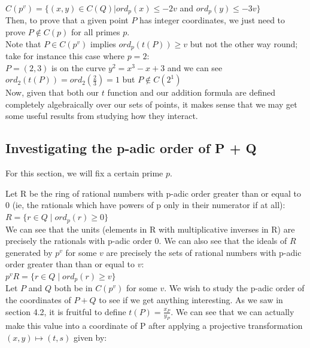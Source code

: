 \documentclass{article}
\begin{document}
$C(p^v) = \{(x, y) \in C(Q) | ord_p(x) \leq -2v$ and $ord_p(y) \leq -3v\}$\\

Then, to prove that a given point $P$ has integer coordinates, we just need to prove $P \notin C(p)$ for all primes $p$.\\

Note that $P \in C(p^v)$ implies $ord_p(t(P)) \geq v$ but not the other way round; take for instance this case where $p = 2$:\\

$P = (2, 3)$ is on the curve $y^2 = x^3 - x + 3$ and we can see $ord_2(t(P)) = ord_2(\frac{2}{3}) = 1$ but $P \notin C(2^1)$ \\

Now, given that both our $t$ function and our addition formula are defined completely algebraically over our sets of points, it makes sense that we may get some useful results from studying how they interact.

\subsection{Investigating the p-adic order of P + Q}

For this section, we will fix a certain prime $p$.

Let R be the ring of rational numbers with p-adic order greater than or equal to 0 (ie, the rationals which have powers of p only in their numerator if at all):\\

$R = \{r \in Q \; | \; ord_p(r) \geq 0\}$\\

We can see that the units (elements in R with multiplicative inverses in R) are precisely the rationals with p-adic order 0. We can also see that the ideals of $R$ generated by $p^v$ for some $v$ are precisely the sets of rational numbers with p-adic order greater than than or equal to $v$:\\

$p^vR = \{r \in Q \; | \; ord_p(r) \geq v\}$\\

Let $P$ and $Q$ both be in $C(p^v)$ for some $v$. We wish to study the p-adic order of the coordinates of $P + Q$ to see if we get anything interesting. As we saw in section 4.2, it is fruitful to define $t(P) = \frac{x_P}{y_P}$. We can see that we can actually make this value into a coordinate of P after applying a projective transformation $(x, y) \mapsto (t, s)$ given by:\\
\end{document}
